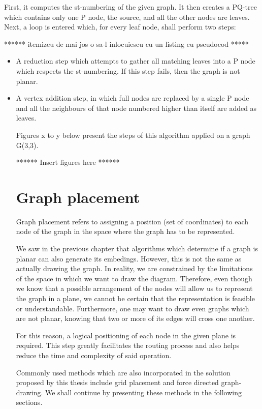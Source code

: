 First, it computes the st-numbering of the given graph. It then creates a PQ-tree which contains only one P node, the 
source, and all the other nodes are leaves. Next, a loop is entered which, for every leaf node, shall perform two steps:

****** itemizeu de mai jos o sa-l inlocuiescu cu un listing cu pseudocod *****

\begin{itemize}
\item A reduction step which attempts to gather all matching leaves into a P node which respects the st-numbering. If this 
step fails, then the graph is not planar.
\item A vertex addition step, in which full nodes are replaced by a single P node and all the neighbours of that node 
numbered higher than itself are added as leaves.

Figures x to y below present the steps of this algorithm applied on a graph G(3,3).

****** Insert figures here ******


\section{Graph placement}

Graph placement refers to assigning a position (set of coordinates) to each node of the graph in the space where 
the graph has to be represented.

We saw in the previous chapter that algorithms which determine if a graph is planar can also generate its 
embedings. However, this is not the same as actually drawing the graph. In reality, we are constrained by the 
limitations of the space in which we want to draw the diagram. Therefore, even though we know that a possible 
arrangement of the nodes will allow us to represent the graph in a plane, we cannot be certain that the 
representation is feasible or understandable. Furthermore, one may want to draw even graphs which are not planar, 
knowing that two or more of its edges will cross one another.

For this reason, a logical positioning of each node in the given plane is required. This step greatly facilitates 
the routing process and also helps reduce the time and complexity of said operation.

Commonly used methods which are also incorporated in the solution proposed by this thesis include grid placement and 
force directed graph-drawing. We shall continue by presenting these methods in the following sections.


\end{itemize}
